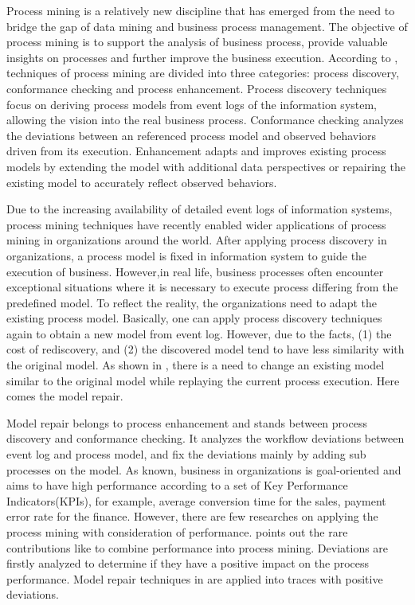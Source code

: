 %
Process mining is a relatively new discipline that has emerged from the need to bridge the gap of data mining and business process management. The objective of process mining is to support the analysis of business process, provide valuable insights on processes and further improve the business execution. According to \cite{van2011process}, techniques of process mining are divided into three categories: process discovery, conformance checking and process enhancement. Process discovery techniques focus on deriving process models from event logs of the information system, allowing the vision into the real business process. Conformance checking analyzes the deviations between an referenced process model and observed behaviors driven from its execution. Enhancement adapts and improves existing process models by extending the model with additional data perspectives or repairing the existing model to accurately reflect observed behaviors. 

Due to the increasing availability of detailed event logs of information systems, process mining techniques have recently enabled wider applications of process mining in organizations around the world\cite{van2011process}.  After applying process discovery in organizations, a process model is fixed in information system to guide the execution of business. However,in real life, business processes often encounter exceptional situations where it is necessary to execute process differing from the predefined model. To reflect the reality, the organizations need to adapt the existing process model. Basically, one can apply process discovery techniques again to obtain a new model from event log. However, due to the facts, (1) the cost of rediscovery, and (2)  the discovered model tend to have less similarity with the original model\cite{fahland2012repairing}. As shown in \cite{fahland2012repairing}, there is a need to change an existing model similar to the original model while replaying the current process execution. Here comes the model repair. 

Model repair belongs to process enhancement and stands between process discovery and conformance checking. It analyzes the workflow deviations between event log  and process model, and fix the deviations mainly by adding sub processes on the model. As known, business in organizations is goal-oriented and aims to have high performance according to a set of Key Performance Indicators(KPIs), for example, average conversion time for the sales, payment error rate for the finance. However, there are few researches on applying the process mining with consideration of performance\cite{ghasemi2016process}.  \cite{ghasemi2016process} points out the rare contributions like \cite{dees2017enhancing} to combine performance into process mining. Deviations are firstly analyzed to determine if they have a positive impact on the process performance. Model repair techniques in \cite{fahland2015model} are applied into traces with positive deviations.

